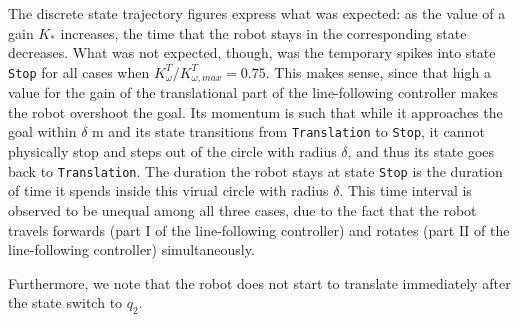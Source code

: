 The discrete state trajectory figures express what was expected: as the value
of a gain $K_{*}$ increases, the time that the robot stays in the corresponding
state decreases. What was not expected, though, was the temporary spikes into
state \texttt{Stop} for all cases when $K_{\omega}^T / K_{\omega,max}^T = 0.75$.
This makes sense, since that high a value for the gain of the translational
part of the line-following controller makes the robot overshoot the goal. Its
momentum is such that while it approaches the goal within $\delta$ m and its
state transitions from \texttt{Translation} to \texttt{Stop}, it cannot physically
stop and steps out of the circle with radius $\delta$, and thus its state goes back
to \texttt{Translation}. The duration the robot stays at state \texttt{Stop} is
the duration of time it spends inside this virual circle with radius $\delta$.
This time interval is observed to be unequal among all three cases, due to the
fact that the robot travels forwards (part I of the line-following controller)
and rotates (part II of the line-following controller) simultaneously.

Furthermore, we note that the robot does not start to translate immediately after
the state switch to $q_2$.


\begin{figure}[H]
\begin{multicols}{2}
\quad
{}

\quad
{}

\quad
{}

\end{multicols}
\caption{}
\label{multifig:19_1}
\end{figure}

